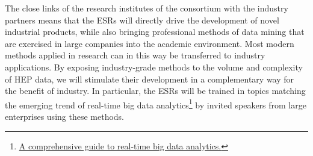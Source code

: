 The close links of the research institutes of the consortium with the industry partners means that the ESRs will directly drive the development of novel industrial products, while also bringing professional methods of data mining that are exercised in large companies into the academic environment. 
Most modern methods applied in research can in this way be transferred to industry applications. 
By exposing industry-grade methods to the volume and complexity of HEP data, we will stimulate their development in a complementary way for the benefit of industry.
In particular, the ESRs will be trained in topics matching the emerging trend of real-time big data analytics\footnote{\href{https://www.scnsoft.com/blog/real-time-big-data-analytics-comprehensive-guide}{A comprehensive guide to real-time big data analytics.}} by invited speakers from large enterprises using these methods.   



